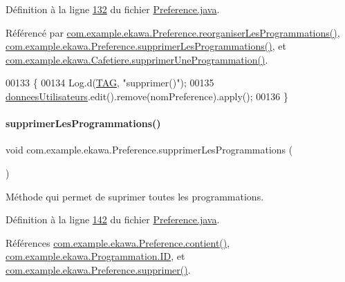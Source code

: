 Définition à la ligne \hyperlink{_preference_8java_source_l00132}{132} du fichier \hyperlink{_preference_8java_source}{Preference.\+java}.



Référencé par \hyperlink{_preference_8java_source_l00157}{com.\+example.\+ekawa.\+Preference.\+reorganiser\+Les\+Programmations()}, \hyperlink{_preference_8java_source_l00142}{com.\+example.\+ekawa.\+Preference.\+supprimer\+Les\+Programmations()}, et \hyperlink{_cafetiere_8java_source_l00820}{com.\+example.\+ekawa.\+Cafetiere.\+supprimer\+Une\+Programmation()}.


\begin{DoxyCode}
00133     \{
00134         Log.d(\hyperlink{classcom_1_1example_1_1ekawa_1_1_preference_aeb5e1e787153c37929839622ac5d0339}{TAG}, \textcolor{stringliteral}{"supprimer()"});
00135         \hyperlink{classcom_1_1example_1_1ekawa_1_1_preference_a5ac49439bd1c8c3ff12dd9eb2475b894}{donneesUtilisateurs}.edit().remove(nomPreference).apply();
00136     \}
\end{DoxyCode}
\mbox{\label{classcom_1_1example_1_1ekawa_1_1_preference_aec0e98bb3cfb4d104c5c86a4259c56b5}} 
\paragraph{\texorpdfstring{supprimer\+Les\+Programmations()}{supprimerLesProgrammations()}}
{\footnotesize\ttfamily void com.\+example.\+ekawa.\+Preference.\+supprimer\+Les\+Programmations (\begin{DoxyParamCaption}{ }\end{DoxyParamCaption})}



Méthode qui permet de suprimer toutes les programmations. 



Définition à la ligne \hyperlink{_preference_8java_source_l00142}{142} du fichier \hyperlink{_preference_8java_source}{Preference.\+java}.



Références \hyperlink{_preference_8java_source_l00087}{com.\+example.\+ekawa.\+Preference.\+contient()}, \hyperlink{_programmation_8java_source_l00025}{com.\+example.\+ekawa.\+Programmation.\+ID}, et \hyperlink{_preference_8java_source_l00132}{com.\+example.\+ekawa.\+Preference.\+supprimer()}.



